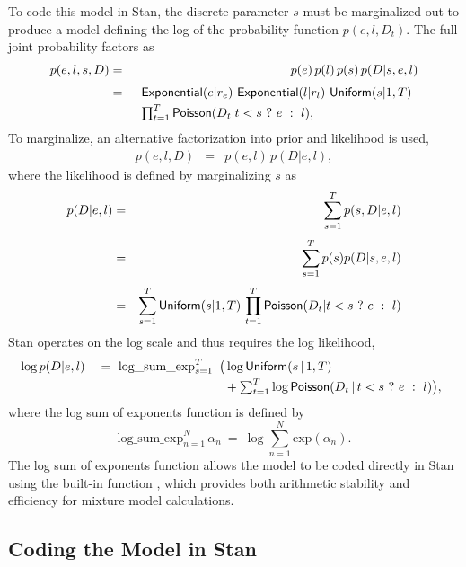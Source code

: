 To code this model in Stan, the discrete parameter $s$ must be
marginalized out to produce a model defining the log of the
probability function $p(e,l,D_t)$.  The full joint probability factors
as
%
\begin{eqnarray*}
p(e,l,s,D)
& = & p(e) \, p(l) \, p(s) \, p(D | s, e, l)
\\[3pt]
& = &
\begin{array}[t]{l}
\mbox{\sf Exponential}(e|r_e) \ \mbox{\sf Exponential}(l|r_l) \
\mbox{\sf Uniform}(s|1, T)
\\[3pt]
\prod_{t=1}^T \mbox{\sf Poisson}(D_t | t < s \ ? \ e \ : \ l),
\end{array}
\end{eqnarray*}
%
To marginalize, an alternative factorization into prior and likelihood
is used,
%
\begin{eqnarray*}
p(e,l,D) & = & p(e,l) \, p(D|e,l),
\end{eqnarray*}
%
where the likelihood is defined by marginalizing $s$ as
%
\begin{eqnarray*}
p(D | e,l)
& = &
\sum_{s=1}^T p(s, D | e,l)
\\[3pt]
& = &
\sum_{s=1}^T p(s) p(D | s,e,l)
\\[3pt]
& = &
\sum_{s=1}^T \mbox{\sf Uniform}(s | 1,T)
\, \prod_{t=1}^T \mbox{\sf Poisson}(D_t | t < s \ ? \ e \ : \ l)
\end{eqnarray*}
%
Stan operates on the log scale and thus requires the log likelihood,
%
\[
\log p(D | e,l)
\\[3pt]
\mbox{ } \ \ = \
\mbox{log\_sum\_exp}_{s=1}^T
\begin{array}[t]{l}
\big(
 \log \mbox{\sf Uniform}(s \, | \, 1, T)
\\[3pt]
{} \hspace*{4pt} + \sum_{t=1}^T \log \mbox{\sf Poisson}(D_t \, | \, t < s \ ?
\ e \ : \ l) \big),
\end{array}
\]
%
where the log sum of exponents function is defined by
\[
\mbox{log\_sum\_exp}_{n=1}^N \, \alpha_n
\ = \
\log \sum_{n=1}^N \mbox{exp}(\alpha_n).
\]
%
The log sum of exponents function allows the model to be coded
directly in Stan using the built-in function ,
which provides both arithmetic stability and efficiency for mixture
model calculations.


\subsection{Coding the Model in Stan}

